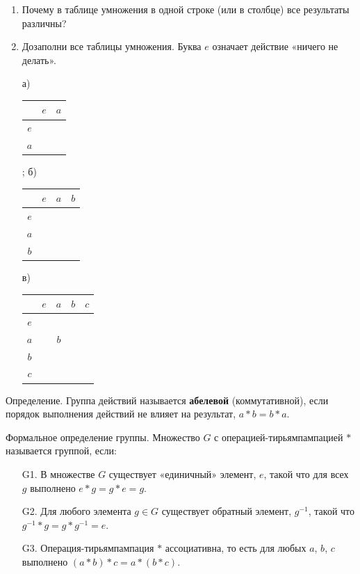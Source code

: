 \documentclass[12pt]{article} %
\begin{document}
\begin{enumerate}[resume]
\begin{enumerate}
\end{enumerate}

\item Почему в таблице умножения в одной строке (или в столбце) все результаты различны?

\item Дозаполни все таблицы умножения. Буква $e$ означает действие «ничего не делать».


  \begin{minipage}[c]{\textwidth}
  \centering
  а)
  \begin{tabular}{c|c|c|}
       & $e$ & $a$  \\
  \midrule
  $e$  &     &      \\
  \midrule
  $a$  &     &      \\
  \midrule
  \end{tabular};
  \;
  б)
  \begin{tabular}{c|c|c|c}
       & $e$ & $a$ & $b$\\
  \midrule
  $e$  &     &    &  \\
  \midrule
  $a$  &     &    &  \\
  \midrule
  $b$  &     &    &  \\
  \midrule
  \end{tabular}
  \;
  в)
  \begin{tabular}{c|c|c|c|c}
       & $e$ & $a$ & $b$ & $c$ \\
  \midrule
  $e$  &     &    &   & \\
  \midrule
  $a$  &     & $b$ &   &  \\
  \midrule
  $b$  &     &    &   &  \\
  \midrule
  $c$  &     &    &   &  \\
  \midrule
  \end{tabular}
  \end{minipage}

\end{enumerate}

Определение. Группа действий называется \textbf{абелевой} (коммутативной), если порядок выполнения действий не влияет на результат, $a * b = b * a$.

Формальное определение группы. Множество $G$ с операцией-тирьямпампацией $*$ называется группой, если:
\begin{enumerate}
  \item[G1.] В множестве $G$ существует «единичный» элемент, $e$, такой что для всех $g$ выполнено $e*g=g*e=g$.
  \item[G2.] Для любого элемента $g \in G$ существует обратный элемент, $g^{-1}$, такой что $g^{-1}*g=g*g^{-1}=e$.
  \item[G3.] Операция-тирьямпампация $*$ ассоциативна, то есть для любых $a$, $b$, $c$ выполнено $(a * b) * c = a * (b * c)$.
\end{enumerate}
\end{document}
